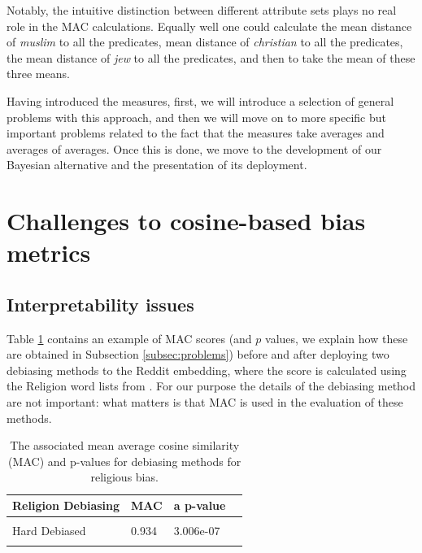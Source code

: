 \documentclass{clv3}
\begin{document}
Notably, the intuitive distinction between different attribute sets
plays no real role in the \textsf{MAC} calculations. Equally well one
could calculate the mean distance of \emph{muslim} to all the
predicates, mean distance of \emph{christian} to all the predicates,
the mean distance of \emph{jew} to all the predicates, and then to take the
mean of these three means.

Having introduced the measures, first, we will introduce a selection of
general problems with this approach, and then we will move on to more
specific but important problems related to the fact that the measures
take averages and averages of averages. Once this is done, we move to
the development of our Bayesian alternative and the presentation of its
deployment.





\hypertarget{challenges-to-cosine-based-bias-metrics}{%
\section{Challenges to cosine-based bias
metrics}\label{challenges-to-cosine-based-bias-metrics}}

\label{sec:challenges}

\hypertarget{interpretability-issues}{%
\subsection{Interpretability issues}\label{interpretability-issues}}

\label{subsec:interpretability}

Table \ref{tab:religionOriginal2} contains an example of \textsf{MAC}
scores (and \(p\) values, we explain how these are obtained in
Subsection \ref{subsec:problems}) before and after deploying two
debiasing methods to the Reddit embedding, where the score is calculated
using the Religion word lists from \citep{Manzini2019blackToCriminal}. For our purpose the details
of the debiasing method are not important: what matters is that
\textsf{MAC} is used in the evaluation of these methods.

\begin{table}
\footnotesize

\centering

\begin{tabular}[t]{lllr}
\toprule
Religion Debiasing & \textsf{MAC} & a p-value \\
\midrule
\cellcolor{gray!15}{Biased} & \cellcolor{gray!15}{0.859} & \cellcolor{gray!15}{N/A} \\
Hard Debiased & 0.934 & 3.006e-07\\
\cellcolor{gray!15}{Soft Debiased ($\lambda$ = 0.2)} & \cellcolor{gray!15}{0.894} & \cellcolor{gray!15}{0.007} \\
\bottomrule
\end{tabular}

\caption{The associated mean average cosine similarity
(\textsf{MAC}) and p-values for debiasing methods for religious bias.}
\label{tab:religionOriginal2}
\normalsize 
\end{table}
\end{document}
